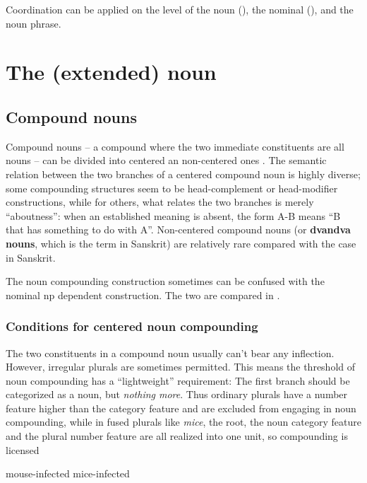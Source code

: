 \documentclass[UTF8, a4paper, oneside, scheme=plain, 12pt]{ctexbook}
\newcommand*{\citesec}[1]{\S~{#1}}
\newcommand*{\citepages}[1]{pp.~{#1}}
\newcommand*{\concept}[1]{\textbf{#1}}
\newcommand{\form}[1]{\emph{#1}}
\begin{document}
Coordination can be applied on the level of the noun
(), 
the nominal (), 
and the noun phrase. 


\section{The (extended) noun}\label{sec:np.head}

\subsection{Compound nouns}\label{sec:pos.noun.compound}

Compound nouns -- a compound where the two immediate constituents are all nouns -- 
can be divided into centered an non-centered ones
\citep[\citepages{1646-1648}]{cgel}.
The semantic relation between the two branches of a centered compound noun
is highly diverse; 
some compounding structures seem to be head-complement or head-modifier constructions,
while for others, what relates the two branches is merely ``aboutness'':
when an established meaning is absent,
the form A-B means ``B that has something to do with A''.
Non-centered compound nouns 
(or \concept{dvandva nouns}, which is the term in Sanskrit) 
are relatively rare
compared with the case in Sanskrit.

The noun compounding construction 
sometimes can be confused with the nominal \acs{np} dependent construction. 
The two are compared in .

\subsubsection{Conditions for centered noun compounding}

The two constituents in a compound noun usually can't bear any inflection.
However, irregular plurals are sometimes permitted.
This means the threshold of noun compounding has a ``lightweight'' requirement:
The first branch should be categorized as a noun,
but \emph{nothing more}.
Thus ordinary plurals have a number feature higher than the category feature 
and are excluded from engaging in noun compounding,
while in fused plurals like \form{mice},
the root, the noun category feature and the plural number feature 
are all realized into one unit,
so compounding is licensed \citep[\citesec{7.1}]{siddiqi2009syntax}

\begin{exe}
    \ex \begin{xlist}
        \ex mouse-infected
        \ex mice-infected
    \end{xlist}
\end{exe}
\end{document}
